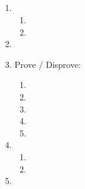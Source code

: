 \documentclass{article}
\title{
    \textmd{\bd{\hmwkClass:\ \hmwkTitle}}\\
}
\author{\hmwkAuthorName}
\begin{document}
\maketitle

\begin{enumerate}
      \item
            \begin{enumerate}
                  \item 
                        \pagebreak

                  \item 
            \end{enumerate}

            \pagebreak

      \item 

            \pagebreak

      \item Prove / Disprove:
            \begin{enumerate}
                  \item 
                  \item 
                        \pagebreak

                  \item 
                  \item 
                  \item \TODO 
            \end{enumerate}

            \pagebreak

      \item
            \begin{enumerate}
                  \item \REV 
                  \item \REV 
            \end{enumerate}

      \item \TODO 


\end{enumerate}

 \TODO
\end{document}
